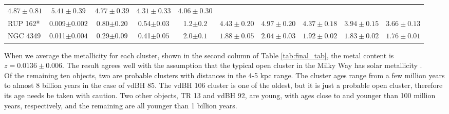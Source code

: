 \documentclass[draft]{aa}
\begin{document}
\begin{table*}[ht]
\begin{tabular}{lccccccccc}
 $4.87\pm0.81$ & $5.41\pm0.39$ & $4.77\pm0.39$ & $4.31\pm0.33$ & $4.06\pm0.30$\\
 RUP 162* & 0.009$\pm0.002$ & 0.80$\pm0.20$ & 0.54$\pm0.03$ & 1.2$\pm0.2$ &
 $4.43\pm0.20$ & $4.97\pm0.20$ & $4.37\pm0.18$ & $3.94\pm0.15$ & $3.66\pm0.13$\\
 NGC 4349 & 0.011$\pm0.004$ & 0.29$\pm0.09$ & 0.41$\pm0.05$ & 2.0$\pm0.1$ &
 $1.88\pm0.05$ & $2.04\pm0.03$ & $1.92\pm0.02$ & $1.83\pm0.02$ & $1.76\pm0.01$\\
\hline
\end{tabular}
\label{tab:final_tab}
\end{table*}

When we average the metallicity for each cluster, shown in the second
column of Table \ref{tab:final_tab}, the metal content is $z=0.0136\pm0.006$.
The result agrees well with the assumption that the typical  open cluster in the Milky Way has solar metallicity \citep[$z=0.0152$,][]{Bressan_2012}.\\

Of the remaining ten objects, two are probable clusters with distances in the
4-5 kpc range. The cluster ages range from a few million years
to almost 8 billion years in the case of vdBH 85. The vdBH 106 cluster
is one of the oldest, but it is just a probable open cluster, therefore its age needs
be taken with caution. Two other objects, TR 13 and vdBH 92, are young, with
ages close to and younger than 100 million years, respectively, and the remaining are all
younger than 1 billion years.
\end{document}
